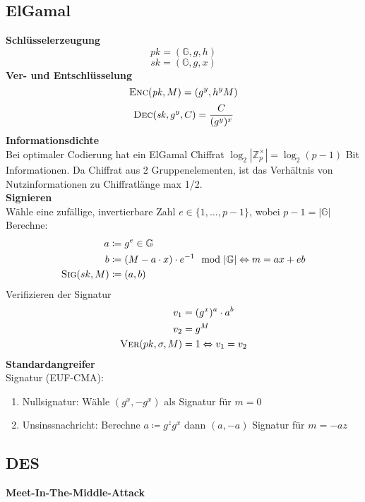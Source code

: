 \documentclass[10pt,a4paper]{article}
\begin{document}
        \subsection{ElGamal}
        \textbf{Schlüsselerzeugung}
        \[\mathit{pk} = (\mathbb{G},g,h)\]
        \[\mathit{sk} = (\mathbb{G},g,x)\]
        \textbf{Ver- und Entschlüsselung}
        \[\textsc{Enc}(\mathit{pk}, M) = (g^y, h^yM)\]
        \[\textsc{Dec}(\mathit{sk}, g^y, C) = \frac{C}{(g^y)^x}\]
        \textbf{Informationsdichte}\\
        Bei optimaler Codierung hat ein ElGamal Chiffrat \(\log_2 | \mathbb{Z}_p^{\times}| = \log_2(p-1)\)
        Bit Informationen. Da Chiffrat aus 2 Gruppenelementen, ist das Verhältnis von Nutzinformationen zu Chiffratlänge max 1/2. \\
        \textbf{Signieren}\\
        Wähle eine zufällige, invertierbare Zahl \(e \in \{1,..., p-1\}\), wobei \(p - 1 = |\mathbb{G}|\)
        Berechne:
        \begin{align*}
          a &\coloneqq g^e \in \mathbb{G} \\
          b &\coloneqq (M - a \cdot x) \cdot e^{-1} \mod |\mathbb{G}| \Leftrightarrow m = ax + eb\\
          \textsc{Sig}(sk, M) &\coloneqq (a,b)
        \end{align*}
        Verifizieren der Signatur
        \begin{align*}
          v_1 &= (g^x)^a \cdot a^b\\
          v_2 &= g^M\\
          \textsc{Ver}(pk,\sigma, M) &= 1 \Leftrightarrow v_1 = v_2
        \end{align*}
        \textbf{Standardangreifer}\\
        Signatur (EUF-CMA):\\
        \begin{enumerate}
        \item Nullsignatur: Wähle \((g^x, -g^x)\) als Signatur für \(m=0\)
          \item Unsinssnachricht: Berechne \(a \coloneqq g^zg^x\) dann \((a, -a)\) Signatur für \(m=-az\)
        \end{enumerate}

        \subsection{DES}
        \textbf{Meet-In-The-Middle-Attack}
        
\end{document}
